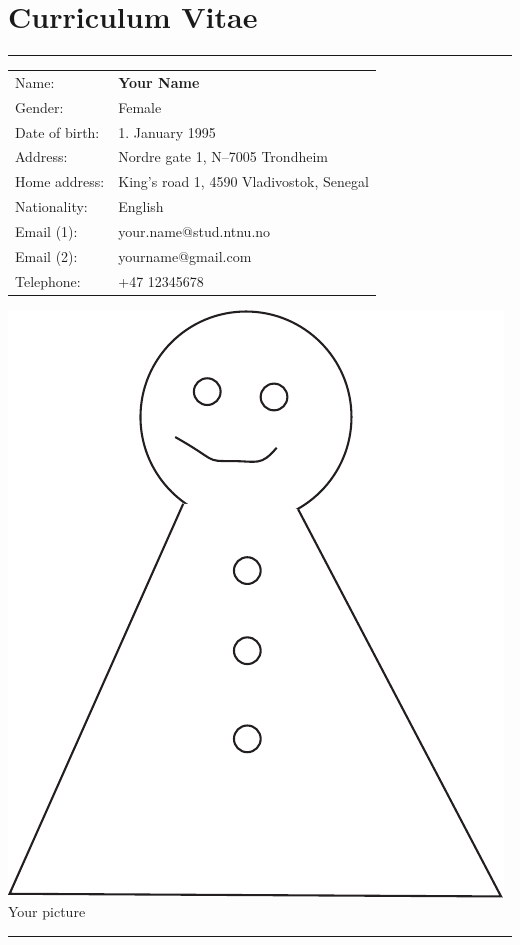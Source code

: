 \chapter*{Curriculum Vitae}
\hrule
\begin{minipage}[t]{0.65\linewidth}
\begin{tabular}{ll}
Name: & \textbf{Your Name}\\
Gender: & Female\\
Date of birth: & 1. January 1995\\
Address: & Nordre gate 1, N--7005 Trondheim \\
Home address: & King's road 1, 4590 Vladivostok, Senegal\\
Nationality:    & English \\
Email (1): & your.name@stud.ntnu.no\\
Email (2): & yourname@gmail.com\\
Telephone: & +47 12345678\\
\end{tabular} 
\end{minipage}\hfill
\begin{minipage}[t]{0.25\linewidth}
\includegraphics[scale=0.3]{fig/me}\\[1pc] Your picture
\end{minipage}
\hrule

